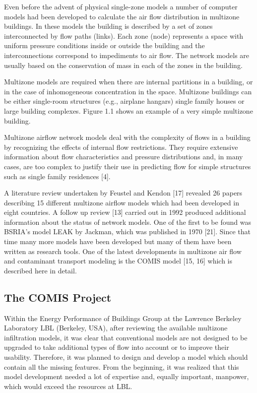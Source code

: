 \documentclass[10pt]{article}
\begin{document}
Even before the advent of physical single-zone models a number of computer models had been developed to calculate the air flow distribution in multizone buildings. In these models the building is described by a set of zones interconnected by flow paths (links). Each zone (node) represents a space with uniform pressure conditions inside or outside the building and the interconnections correspond to impediments to air flow. The network models are usually based on the conservation of mass in each of the zones in the building.

Multizone models are required when there are internal partitions in a building, or in the case of inhomogeneous concentration in the space. Multizone buildings can be either single-room structures (e.g., airplane hangars) single family houses or large building complexes. Figure 1.1 shows an example of a very simple multizone building.

Multizone airflow network models deal with the complexity of flows in a building by recognizing the effects of internal flow restrictions. They require extensive information about flow characteristics and pressure distributions and, in many cases, are too complex to justify their use in predicting flow for simple structures such as single family residences [4].

A literature review undertaken by Feustel and Kendon [17] revealed 26 papers describing 15 different multizone airflow models which had been developed in eight countries. A follow up review [13] carried out in 1992 produced additional information about the status of network models. One of the first to be found was BSRIA's model LEAK by Jackman, which was published in 1970 [21]. Since that time many more models have been developed but many of them have been written as research tools. One of the latest developments in multizone air flow and contaminant transport modeling is the COMIS model [15, 16] which is described here in detail.

\subsection{The COMIS Project}

Within the Energy Performance of Buildings Group at the Lawrence Berkeley Laboratory LBL (Berkeley, USA), after reviewing the available multizone infiltration models, it was clear that conventional models are not designed to be upgraded to take additional types of flow into account or to improve their usability. Therefore, it was planned to design and develop a model which should contain all the missing features. From the beginning, it was realized that this model development needed a lot of expertise and, equally important, manpower, which would exceed the resources at LBL. 
\end{document}
